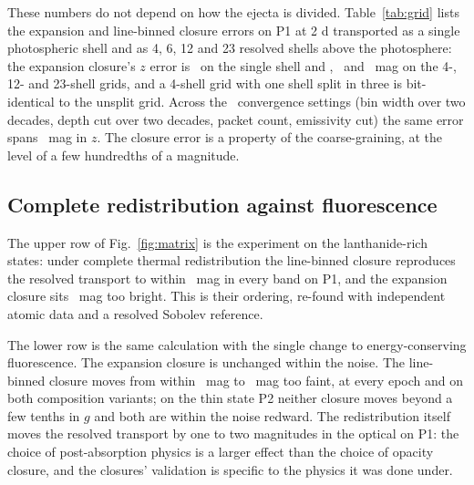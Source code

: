 \documentclass[fleqn,usenatbib]{mnras}
\newcommand{\Pone}{P1\xspace}
\newcommand{\Ptwo}{P2\xspace}
\begin{document}
These numbers do not depend on how the ejecta is divided. Table~\ref{tab:grid} lists the expansion and line-binned closure errors on \Pone at 2 d transported as a single photospheric shell and as 4, 6, 12 and 23 resolved shells above the photosphere: the expansion closure's $z$ error is \GridSingleZ\ on the single shell and \GridFourZ, \GridTwelveZ\ and \GridTwentythreeZ\ mag on the 4-, 12- and 23-shell grids, and a 4-shell grid with one shell split in three is bit-identical to the unsplit grid. Across the \ConvNsettings\ convergence settings (bin width over two decades, depth cut over two decades, packet count, emissivity cut) the same error spans \ConvZ\ mag in $z$. The closure error is a property of the coarse-graining, at the level of a few hundredths of a magnitude.

\begin{table}
\caption{Grid invariance: closure minus resolved transport on \Pone at 2 d under fluorescence, on single shells around the photosphere and on multi-shell grids above it.}
\label{tab:grid}
\footnotesize

\end{table}

\subsection{Complete redistribution against fluorescence}\label{sec:redistribution}

The upper row of Fig.~\ref{fig:matrix} is the \citet{fontes2020} experiment on the lanthanide-rich states: under complete thermal redistribution the line-binned closure reproduces the resolved transport to within \BbinthRthPoneAbsmax\ mag in every band on \Pone, and the expansion closure sits \BthRthPone\ mag too bright. This is their ordering, re-found with independent atomic data and a resolved Sobolev reference.

The lower row is the same calculation with the single change to energy-conserving fluorescence. The expansion closure is unchanged within the noise. The line-binned closure moves from within \BbinthRthPoneAbsmax\ mag to \BbinRtwoPone\ mag too faint, at every epoch and on both composition variants; on the thin state \Ptwo neither closure moves beyond a few tenths in $g$ and both are within the noise redward. The redistribution itself moves the resolved transport by one to two magnitudes in the optical on \Pone: the choice of post-absorption physics is a larger effect than the choice of opacity closure, and the closures' validation is specific to the physics it was done under.
\end{document}

